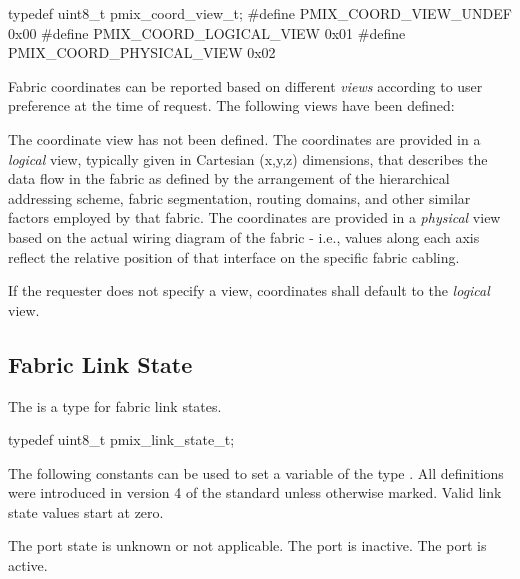 \cspecificstart
\begin{codepar}
typedef uint8_t pmix_coord_view_t;
#define PMIX_COORD_VIEW_UNDEF       0x00
#define PMIX_COORD_LOGICAL_VIEW     0x01
#define PMIX_COORD_PHYSICAL_VIEW    0x02
\end{codepar}
\cspecificend

Fabric coordinates can be reported based on different \emph{views} according to user preference at the time of request. The following views have been defined:

\begin{constantdesc}
%
The coordinate view has not been defined.
%
The coordinates are provided in a \emph{logical} view, typically given in Cartesian (x,y,z) dimensions, that describes the data flow in the fabric as defined by the arrangement of the hierarchical addressing scheme, fabric segmentation, routing domains, and other similar factors employed by that fabric.
%
The coordinates are provided in a \emph{physical} view based on the actual wiring diagram of the fabric - i.e., values along each axis reflect the relative position of that interface on the specific fabric cabling.
%
\end{constantdesc}

If the requester does not specify a view, coordinates shall default to the \emph{logical} view.

\subsection{Fabric Link State}

The  is a  type for fabric link states.

\cspecificstart
\begin{codepar}
typedef uint8_t pmix_link_state_t;
\end{codepar}
\cspecificend

The following constants can be used to set a variable of the type . All definitions were introduced in version 4 of the standard unless otherwise marked. Valid link state values start at zero.

\begin{constantdesc}
%
The port state is unknown or not applicable.
%
The port is inactive.
%
The port is active.
%
\end{constantdesc}

